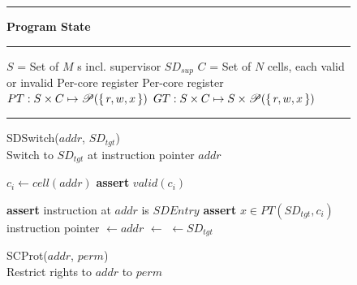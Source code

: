 \begin{figure}
  \vspace{-1\baselineskip}
  \rule{\textwidth}{1pt}
  \centering
  \textbf{\seccells Program State\\}
  \vspace{-0.5\baselineskip}
  \rule{\textwidth}{1pt}
  \vspace{-2\baselineskip}
  \begin{multicols}{2}
    \begin{algorithmic}[1]
      \State $S$ = Set of $M$ \secdiv{}s incl. supervisor $SD_{sup}$
      \State $C$ = Set of $N$ cells, each valid or invalid
      \State Per-core register \sid
      \State Per-core register \rid
      \State \ptable $PT: S \times C \mapsto \mathscr{P}(\set{r, w, x})$
      \State \gtable $GT: S \times C \mapsto S \times \mathscr{P}(\set{r, w, x})$
    \end{algorithmic}
  \end{multicols}
  \vspace{-1.4\baselineskip}
  \rule{\textwidth}{1pt}

\vspace{-0.7\baselineskip}
\begin{multicols}{2}
\removelatexerror


    \begin{algorithm}[H]
      \caption{SDSwitch($addr$, $SD_{tgt}$) \\
        Switch to $SD_{tgt}$ at instruction pointer $addr$   }
        \begin{algorithmic}[1]

          \State $c_i \gets cell(addr)$
          \State \textbf{assert} $valid(c_i)$

          \State \textbf{assert} instruction at $addr$ is $SDEntry$
          \State \textbf{assert} $x \in PT(SD_{tgt}, c_i)$
          \State instruction pointer $\gets addr$
          \State \rid $\gets$ \sid
          \State \sid $\gets SD_{tgt}$
        \end{algorithmic}
        \label{alg:seccells:sdswitch}
    \end{algorithm}
    \vspace{-0.5\baselineskip}

    \begin{algorithm}[H]
      \caption{SCProt($addr$, $perm$) \\
      Restrict rights to $addr$ to $perm$              }
      \begin{algorithmic}[1]


\end{algorithmic}
\end{algorithm}
\end{multicols}
\end{figure}
